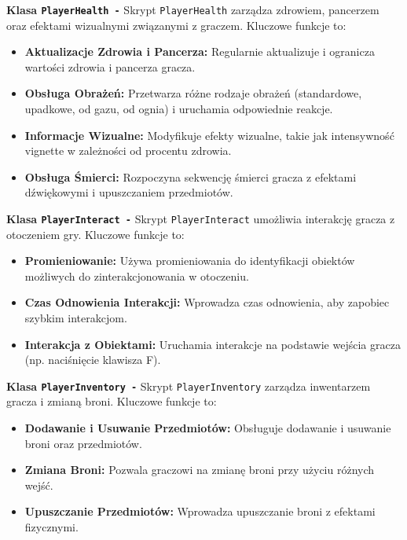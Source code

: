 \textbf{Klasa \texttt{PlayerHealth -}}
Skrypt \texttt{PlayerHealth} zarządza zdrowiem, pancerzem oraz efektami wizualnymi związanymi z graczem. Kluczowe funkcje to:
\begin{itemize}
  \item \textbf{Aktualizacje Zdrowia i Pancerza:} Regularnie aktualizuje i ogranicza wartości zdrowia i pancerza gracza.
  \item \textbf{Obsługa Obrażeń:} Przetwarza różne rodzaje obrażeń (standardowe, upadkowe, od gazu, od ognia) i uruchamia odpowiednie reakcje.
  \item \textbf{Informacje Wizualne:} Modyfikuje efekty wizualne, takie jak intensywność vignette w zależności od procentu zdrowia.
  \item \textbf{Obsługa Śmierci:} Rozpoczyna sekwencję śmierci gracza z efektami dźwiękowymi i upuszczaniem przedmiotów.
\end{itemize}

\textbf{Klasa \texttt{PlayerInteract -}}
Skrypt \texttt{PlayerInteract} umożliwia interakcję gracza z otoczeniem gry. Kluczowe funkcje to:
\begin{itemize}
  \item \textbf{Promieniowanie:} Używa promieniowania do identyfikacji obiektów możliwych do zinterakcjonowania w otoczeniu.
  \item \textbf{Czas Odnowienia Interakcji:} Wprowadza czas odnowienia, aby zapobiec szybkim interakcjom.
  \item \textbf{Interakcja z Obiektami:} Uruchamia interakcje na podstawie wejścia gracza (np. naciśnięcie klawisza F).
\end{itemize}

\textbf{Klasa \texttt{PlayerInventory -}}
Skrypt \texttt{PlayerInventory} zarządza inwentarzem gracza i zmianą broni. Kluczowe funkcje to:
\begin{itemize}
  \item \textbf{Dodawanie i Usuwanie Przedmiotów:} Obsługuje dodawanie i usuwanie broni oraz przedmiotów.
  \item \textbf{Zmiana Broni:} Pozwala graczowi na zmianę broni przy użyciu różnych wejść.
  \item \textbf{Upuszczanie Przedmiotów:} Wprowadza upuszczanie broni z efektami fizycznymi.
\end{itemize}

